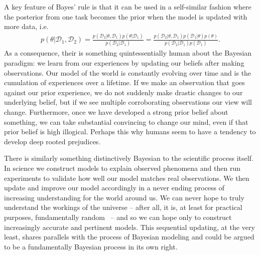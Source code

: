 A key feature of Bayes' rule is that it can be used in a self-similar fashion where the posterior from
one task becomes the prior when the model is updated with more data, i.e.
\begin{align}
	\label{eq:bayes:repeat-bayes}
p(\theta | \mathcal{D}_1, \mathcal{D}_2) = 
\frac{p(\mathcal{D}_2 | \theta, \mathcal{D}_1)p(\theta | \mathcal{D}_1)}{p(\mathcal{D}_2 | \mathcal{D}_1)} =
\frac{p(\mathcal{D}_2 | \theta, \mathcal{D}_1)p(\mathcal{D}_1 | \theta) p(\theta)}
{p(\mathcal{D}_2 | \mathcal{D}_1) p(\mathcal{D}_1)} .
\end{align}
As a consequence, their is something quintessentially human about the Bayesian paradigm: we learn
from our experiences by updating our beliefs after making observations.  Our model of the world
is constantly evolving over time and is the cumulation of experiences over a lifetime.  
If we make an observation that goes against our prior experience, we do not suddenly make
drastic changes to our underlying belief, but if we see multiple corroborating observations our
view will change.
Furthermore, once we have developed
a strong prior belief about something, we can take substantial convincing to change our mind, even
if that prior belief is high illogical.  Perhaps this why humans seem to have a tendency to develop
deep rooted prejudices.

There is similarly something distinctively Bayesian to the scientific process itself.  In science we construct models
to explain observed phenomena and then run experiments to validate how well our model matches
real observations.  We then update and improve our model accordingly in a never ending process of
increasing understanding for the world around us.  We can never hope to truly understand the workings
of the universe  -- after all, it is, at least for practical purposes, fundamentally random~\citep{rainforth2013random} 
-- and so we can hope only to construct increasingly accurate and pertinent models.
This sequential updating, at the very least, shares parallels with the process of Bayesian modeling
and could be argued to be a fundamentally Bayesian process in its own right.

